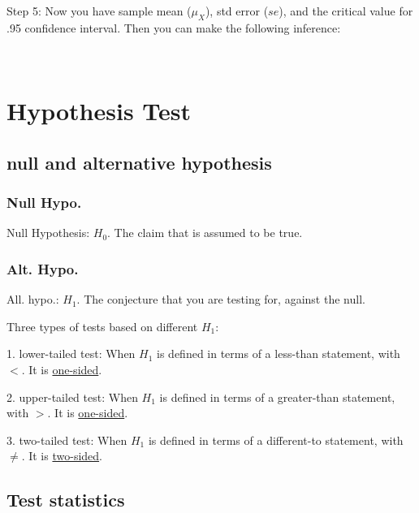 \documentclass[12pt]{article}
\begin{document}
Step 5: Now you have sample mean ($ \mu_{X} $), std error ($ se $), 
and the critical value for .95 confidence interval. Then you can 
make the following inference:

\noindent{}\\






\section{Hypothesis Test}
\subsection{null and alternative hypothesis}
\subsubsection{Null Hypo.}
Null Hypothesis: $ H_0 $. The claim that is assumed to be true.

\subsubsection{Alt. Hypo.}
All. hypo.: $ H_1 $. The conjecture that you are testing for, against
the null.

Three types of tests based on different $ H_1 $:

1. lower-tailed test: When $ H_1 $ is defined in terms of a less-than
statement, with $ < $. It is {\underline {one-sided}}.

2. upper-tailed test: When $ H_1 $ is defined in terms of a greater-than
statement, with $ > $. It is {\underline {one-sided}}.

3. two-tailed test: When $ H_1 $ is defined in terms of a different-to
statement, with $ \ne $. It is {\underline {two-sided}}.










\subsection{Test statistics}
\end{document}
